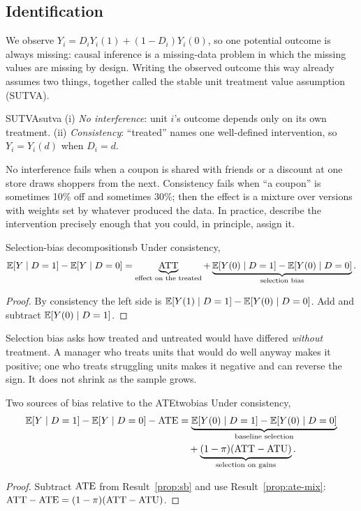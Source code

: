 \documentclass[11pt]{article}
\begin{document}
\subsection{Identification}

We observe $Y_i = D_i Y_i(1) + (1-D_i) Y_i(0)$, so one potential outcome is always missing: causal
inference is a missing-data problem in which the missing values are missing by design. Writing the
observed outcome this way already assumes two things, together called the stable unit treatment value
assumption (SUTVA).

\begin{assum}{SUTVA}{sutva}
(i) \emph{No interference}: unit $i$'s outcome depends only on its own treatment. (ii) \emph{Consistency}:
``treated'' names one well-defined intervention, so $Y_i = Y_i(d)$ when $D_i = d$.
\end{assum}

No interference fails when a coupon is shared with friends or a discount at one store draws shoppers from
the next. Consistency fails when ``a coupon'' is sometimes 10\% off and sometimes 30\%; then
the effect is a mixture over versions with weights set by whatever produced the data. In practice, describe
the intervention precisely enough that you could, in principle, assign it.

\begin{prop}{Selection-bias decomposition}{sb}
Under consistency,
\[
  \mathbb{E}[Y \mid D=1] - \mathbb{E}[Y \mid D=0] = \underbrace{\text{ATT}}_{\text{effect on the treated}}
  + \underbrace{\mathbb{E}[Y(0) \mid D=1] - \mathbb{E}[Y(0) \mid D=0]}_{\text{selection bias}} .
\]
\end{prop}
\begin{proof}
By consistency the left side is $\mathbb{E}[Y(1) \mid D=1] - \mathbb{E}[Y(0) \mid D=0]$. Add and subtract
$\mathbb{E}[Y(0) \mid D=1]$.
\end{proof}

Selection bias asks how treated and untreated would have differed \emph{without} treatment. A manager who
treats units that would do well anyway makes it positive; one who treats struggling units makes it
negative and can reverse the sign. It does not shrink as the sample grows.

\begin{prop}{Two sources of bias relative to the ATE}{twobias}
Under consistency,
\[
\begin{aligned}
  \mathbb{E}[Y \mid D=1] - \mathbb{E}[Y \mid D=0] - \text{ATE} &= \underbrace{\mathbb{E}[Y(0) \mid D=1] - \mathbb{E}[Y(0) \mid D=0]}_{\text{baseline selection}}\\
  &\quad + \underbrace{(1-\pi)(\text{ATT} - \text{ATU})}_{\text{selection on gains}} .
\end{aligned}
\]
\end{prop}
\begin{proof}
Subtract $\text{ATE}$ from Result~\ref{prop:sb} and use Result~\ref{prop:ate-mix}:
$\text{ATT} - \text{ATE} = (1-\pi)(\text{ATT} - \text{ATU})$.
\end{proof}
\end{document}
